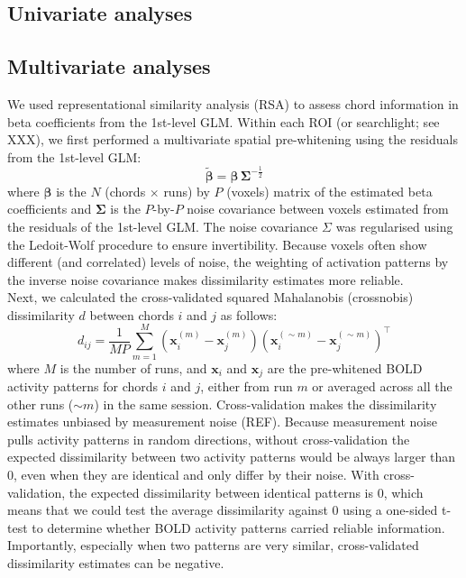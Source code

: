 \documentclass{article}
\begin{document}
\subsection{Univariate analyses}



\subsection{Multivariate analyses}

We used representational similarity analysis (RSA) to assess chord information in beta coefficients from the 1st-level GLM. Within each ROI (or searchlight; see XXX), we first performed a multivariate spatial pre-whitening using the residuals from the 1st-level GLM:
\begin{equation}
    \tilde{\boldsymbol{\beta}} = \boldsymbol{\beta}\,\boldsymbol{\Sigma}^{-\frac{1}{2}}
\end{equation}
where $\boldsymbol{\beta}$ is the $N$ (chords $\times$ runs) by $P$ (voxels) matrix of the estimated beta coefficients and $\boldsymbol{\Sigma}$ is the $P$-by-$P$ noise covariance between voxels estimated from the residuals of the 1st-level GLM. The noise covariance $\Sigma$ was regularised using the Ledoit-Wolf procedure to ensure invertibility. Because voxels often show different (and correlated) levels of noise, the weighting of activation patterns by the inverse noise covariance makes dissimilarity estimates more reliable. \\

Next, we calculated the cross-validated squared Mahalanobis (crossnobis) dissimilarity $d$ between chords $i$ and $j$ as follows:
\begin{equation}
    d_{ij} = \frac{1}{MP} \sum_{m=1}^{M} \left(\mathbf{x}_i^{(m)} - \mathbf{x}_j^{(m)}\right) \left(\mathbf{x}_i^{(\sim m)} - \mathbf{x}_j^{(\sim m)}\right)^\top
\end{equation}
where $M$ is the number of runs, and $\mathbf{x}_i$ and $\mathbf{x}_j$ are the pre-whitened BOLD activity patterns for chords $i$ and $j$, either from run $m$ or averaged across all the other runs ($\sim m$) in the same session. Cross-validation makes the dissimilarity estimates unbiased by measurement noise (REF). Because measurement noise pulls activity patterns in random directions, without cross-validation the expected dissimilarity between two activity patterns would be always larger than 0, even when they are identical and only differ by their noise. With cross-validation, the expected dissimilarity between identical patterns is 0, which means that we could test the average dissimilarity against 0 using a one-sided t-test to determine whether BOLD activity patterns carried reliable information. Importantly, especially when two patterns are very similar, cross-validated dissimilarity estimates can be negative. \\
\end{document}
